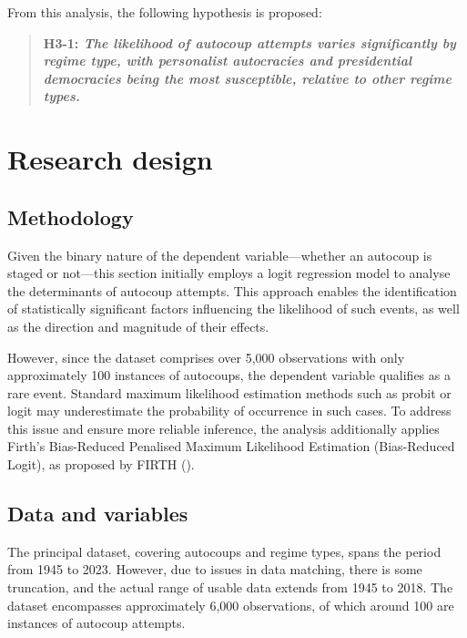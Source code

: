 \documentclass[
  12pt,
]{report}
\begin{document}
From this analysis, the following hypothesis is proposed:

\begin{quote}
\textbf{H3-1: \emph{The likelihood of autocoup attempts varies
significantly by regime type, with personalist autocracies and
presidential democracies being the most susceptible, relative to other
regime types.}}
\end{quote}

\section{Research design}\label{research-design}

\subsection*{Methodology}\label{methodology}

Given the binary nature of the dependent variable---whether an autocoup
is staged or not---this section initially employs a logit regression
model to analyse the determinants of autocoup attempts. This approach
enables the identification of statistically significant factors
influencing the likelihood of such events, as well as the direction and
magnitude of their effects.

However, since the dataset comprises over 5,000 observations with only
approximately 100 instances of autocoups, the dependent variable
qualifies as a rare event. Standard maximum likelihood estimation
methods such as probit or logit may underestimate the probability of
occurrence in such cases. To address this issue and ensure more reliable
inference, the analysis additionally applies Firth's Bias-Reduced
Penalised Maximum Likelihood Estimation (Bias-Reduced Logit), as
proposed by FIRTH ().

\subsection*{Data and variables}\label{data-and-variables}

The principal dataset, covering autocoups and regime types, spans the
period from 1945 to 2023. However, due to issues in data matching, there
is some truncation, and the actual range of usable data extends from
1945 to 2018. The dataset encompasses approximately 6,000 observations,
of which around 100 are instances of autocoup attempts.
\end{document}
